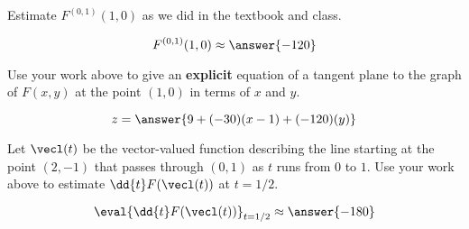 \documentclass{ximera}
\begin{document}
\begin{problem}
Estimate $F^{(0,1)}(1,0)$ as we did in the textbook and class.
\begin{prompt}
\[
  F^{(0,1)}(1,0) \approx \answer{-120}
\]
\end{prompt}

\vfill

\end{problem}


\begin{problem}
  Use your work above to give an \textbf{explicit} equation of a
  tangent plane to the graph of $F(x,y)$ at the point $(1,0)$ in terms
  of $x$ and $y$.
\begin{prompt}
\[
z = \answer{9 + (-30)(x - 1) + (-120)(y)}
\]
\end{prompt}

\vfill

\end{problem}


\begin{problem}
  Let $\vecl(t)$ be the vector-valued function describing the line
  starting at the point $(2,-1)$ that passes through $(0,1)$ as $t$
  runs from $0$ to $1$.  Use your work above to estimate
  $\dd{t}F(\vecl(t))$ at $t = 1/2$.
  \begin{prompt}
  \[
  \eval{\dd{t} F(\vecl(t))}_{t=1/2} \approx \answer{-180}
  \]
  \end{prompt}

  \vfill
  
\end{problem}
\end{document}
